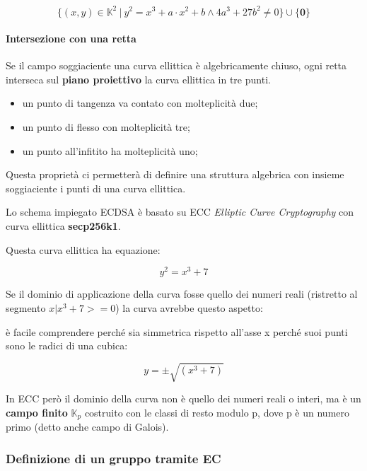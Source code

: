 \documentclass{book}
\theoremstyle{definition}
\newcommand{\CMP}{\mathbb{K}}
\begin{document}
\begin{equation}
    \label{nonSingularCondition}
    \{ (x, y) \in \CMP^2 \ | \ y^{2} = x^{3} + a \cdot x^{2} + b \land 4 a^{3} + 27 b^{2} \ne 0 \} \cup \{\mathbf{0}\}
\end{equation}


\paragraph{Intersezione con una retta}

Se il campo soggiaciente una curva ellittica è algebricamente chiuso, ogni retta interseca sul \textbf{piano proiettivo} la curva ellittica in tre punti.

\begin{itemize}
    \item un punto di tangenza va contato con molteplicità due;
    \item un punto di flesso con molteplicità tre;
    \item un punto all'infitito ha molteplicità uno;
\end{itemize}

Questa proprietà ci permetterà di definire una struttura algebrica con insieme soggiaciente i punti di una curva ellittica.

Lo schema impiegato ECDSA è basato su ECC \textit{Elliptic Curve Cryptography} con curva ellittica \textbf{secp256k1}.

Questa curva ellittica ha equazione:

\begin{equation}
    y^2 = x^3 + 7
\end{equation}

Se il dominio di applicazione della curva fosse quello dei numeri reali (ristretto al segmento $x | x^3 + 7 >= 0$) la curva avrebbe questo aspetto:

è facile comprendere perché sia simmetrica rispetto all'asse x perché suoi punti sono le radici di una cubica:

\begin{equation*}
    y = \pm \sqrt{(x^3+7)}
\end{equation*}

In ECC però il dominio della curva non è quello dei numeri reali o interi, ma è un \textbf{campo finito} $\mathbb{K}_{p}$ costruito con le classi di resto modulo p, dove p è un numero primo (detto anche campo di Galois).

\subsubsection{Definizione di un gruppo tramite EC}
\end{document}
